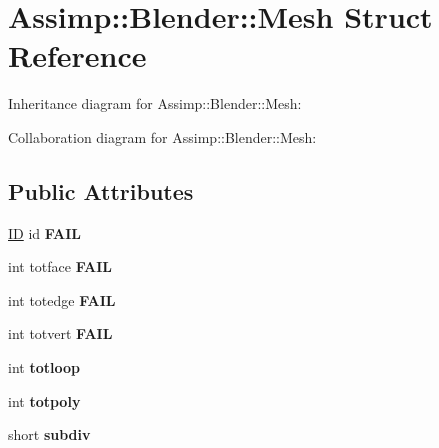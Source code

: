 \hypertarget{struct_assimp_1_1_blender_1_1_mesh}{\section{Assimp\+:\+:Blender\+:\+:Mesh Struct Reference}
\label{struct_assimp_1_1_blender_1_1_mesh}
}


Inheritance diagram for Assimp\+:\+:Blender\+:\+:Mesh\+:


Collaboration diagram for Assimp\+:\+:Blender\+:\+:Mesh\+:
\subsection*{Public Attributes}
\begin{DoxyCompactItemize}
\item 
\hypertarget{struct_assimp_1_1_blender_1_1_mesh_aeab5174481d44caa6b550721244274d5}{\hyperlink{struct_assimp_1_1_blender_1_1_i_d}{I\+D} id {\bfseries F\+A\+I\+L}}\label{struct_assimp_1_1_blender_1_1_mesh_aeab5174481d44caa6b550721244274d5}

\item 
\hypertarget{struct_assimp_1_1_blender_1_1_mesh_ac15dd8a560f4480144d8e982030af211}{int totface {\bfseries F\+A\+I\+L}}\label{struct_assimp_1_1_blender_1_1_mesh_ac15dd8a560f4480144d8e982030af211}

\item 
\hypertarget{struct_assimp_1_1_blender_1_1_mesh_a3b4b5b77ff3c21ce2c8c563a76b34b60}{int totedge {\bfseries F\+A\+I\+L}}\label{struct_assimp_1_1_blender_1_1_mesh_a3b4b5b77ff3c21ce2c8c563a76b34b60}

\item 
\hypertarget{struct_assimp_1_1_blender_1_1_mesh_ade18d8041635be84c43839cc5e542e8c}{int totvert {\bfseries F\+A\+I\+L}}\label{struct_assimp_1_1_blender_1_1_mesh_ade18d8041635be84c43839cc5e542e8c}

\item 
\hypertarget{struct_assimp_1_1_blender_1_1_mesh_aaa7806ed448694d6415e932018c72eeb}{int {\bfseries totloop}}\label{struct_assimp_1_1_blender_1_1_mesh_aaa7806ed448694d6415e932018c72eeb}

\item 
\hypertarget{struct_assimp_1_1_blender_1_1_mesh_ab4a3fc929e58f81b8ce92c82d3ba7395}{int {\bfseries totpoly}}\label{struct_assimp_1_1_blender_1_1_mesh_ab4a3fc929e58f81b8ce92c82d3ba7395}

\item 
\hypertarget{struct_assimp_1_1_blender_1_1_mesh_a363c47fb8af2257bace0198d4bd27be2}{short {\bfseries subdiv}}\label{struct_assimp_1_1_blender_1_1_mesh_a363c47fb8af2257bace0198d4bd27be2}


\end{DoxyCompactItemize}
